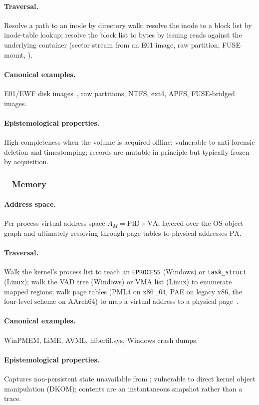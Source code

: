 \paragraph{Traversal.} Resolve a path to an inode by directory walk; resolve
the inode to a block list by inode-table lookup; resolve the block list to
bytes by issuing reads against the underlying container (sector stream from
an E01 image, raw partition, FUSE mount, \etc{}).
\paragraph{Canonical examples.} E01/EWF disk images~\cite{ewf2011}, raw
partitions, NTFS, ext4, APFS, FUSE-bridged images.
\paragraph{Epistemological properties.} High completeness when the volume is
acquired offline; vulnerable to anti-forensic deletion and timestomping;
records are mutable in principle but typically frozen by acquisition.

\subsubsection{ -- Memory}

\paragraph{Address space.} Per-process virtual address space $A_{M} =
\mathrm{PID} \times \mathrm{VA}$, layered over the OS object graph and
ultimately resolving through page tables to physical addresses
$\mathrm{PA}$.
\paragraph{Traversal.} Walk the kernel's process list to reach an
\texttt{EPROCESS} (Windows) or \texttt{task\_struct} (Linux); walk the VAD
tree (Windows) or VMA list (Linux) to enumerate mapped regions; walk page
tables (PML4 on x86\_64, PAE on legacy x86, the four-level scheme on
AArch64) to map a virtual address to a physical
page~\cite{ligh2014artmemory,case2017memory}.
\paragraph{Canonical examples.} WinPMEM, LiME, AVML, hiberfil.sys,
Windows crash dumps.
\paragraph{Epistemological properties.} Captures non-persistent state
unavailable from ; vulnerable to direct kernel object manipulation
(DKOM); contents are an instantaneous snapshot rather than a trace.


